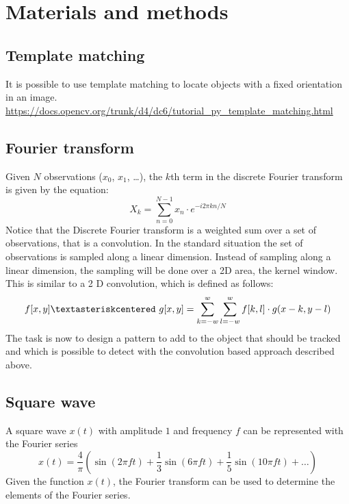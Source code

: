 \documentclass{article}
\begin{document}
\section{Materials and methods}
\subsection{Template matching}
It is possible to use template matching to locate objects with a fixed orientation in an image.
\url{https://docs.opencv.org/trunk/d4/dc6/tutorial_py_template_matching.html}
\subsection{Fourier transform}
Given $N$ observations ($x_0$, $x_1$, \ldots), the $k$th term in
the discrete Fourier transform is given by the equation:
\[
X_{k}=\sum _{n=0}^{N-1} x_{n} \cdot e^{-i2\pi kn/N}
\]
Notice that the Discrete Fourier transform is a weighted sum over a set of observations, that is a convolution.
In the standard situation the set of observations is sampled along a linear dimension.
Instead of sampling along a linear dimension, the sampling will be done over a 2D area, the kernel window.
This is similar to a 2 D convolution, which is defined as follows:
\[
f[x, y] \textasteriskcentered  g[x, y] = \sum_{k = -w}^{w} \sum_{l = -w}^{w} f[k, l] \cdot g(x - k, y - l)
\]
The task is now to design a pattern to add to the object that should be tracked
and which is possible to detect with the convolution based approach described above.
\subsection{Square wave}
A square wave $x(t)$ with amplitude $1$ and frequency $f$ can be represented with the Fourier series
\[
x(t)=\frac{4}{\pi} \left(\sin(2\pi ft)+\frac{1}{3} \sin(6 \pi f t) + \frac{1}{5} \sin(10 \pi f t) + \ldots \right)
\]
Given the function $x(t)$, the Fourier transform can be used to determine the elements
of the Fourier series.
\end{document}
